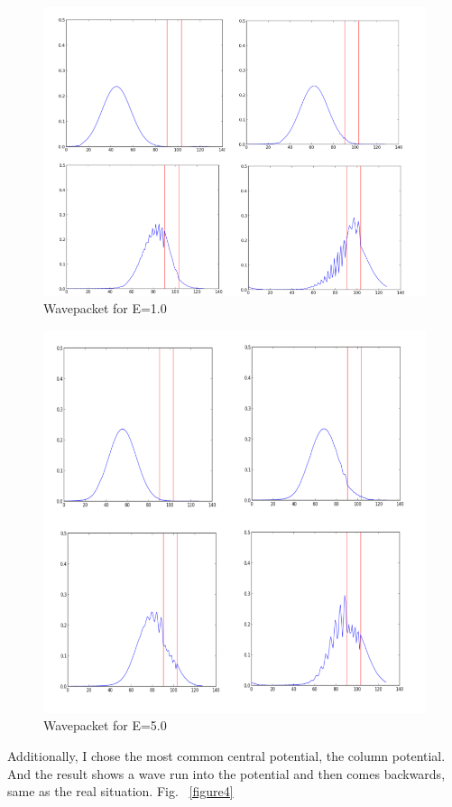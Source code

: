 \documentclass[11pt,letterpaper]{article}
\begin{document}
\begin{figure}
\begin{center}
\includegraphics[width=0.8\linewidth,angle=0]{E1.png}
\caption{Wavepacket for E=1.0}
\label{figure2}
\end{center}
\end{figure}

\begin{figure}
\begin{center}
\includegraphics[width=0.8\linewidth,angle=0]{E5.png}
\caption{Wavepacket for E=5.0}
\label{figure3}
\end{center}
\end{figure}

Additionally, I chose the most common central potential, the column potential. And the result shows a wave run into the potential and then comes backwards, same as the real situation. Fig. ~\ref{figure4}
\end{document}
